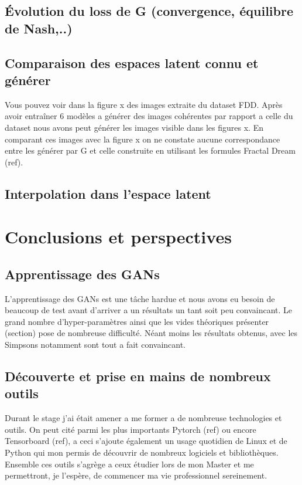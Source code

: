 \documentclass[11pt,francais]{article}
\begin{document}
\subsection{Évolution du loss de G (convergence, équilibre de Nash,..)}
\subsection{Comparaison des espaces latent connu et générer}
Vous pouvez voir dans la figure x des images extraite du dataset FDD.
Après avoir entraîner 6 modèles a générer des images cohérentes par rapport a celle du dataset nous avons peut générer les images visible dans les figures x. 
En comparant ces images avec la figure x on ne constate aucune correspondance entre les générer par G et celle construite en utilisant les formules Fractal Dream (ref).


\subsection{Interpolation dans l'espace latent}

\section{Conclusions et perspectives}

\subsection{Apprentissage des GANs}
L'apprentissage des GANs est une tâche hardue et nous avons eu besoin de beaucoup de test avant d'arriver a un résultats un tant soit peu convaincant. Le grand nombre d'hyper-paramètres ainsi que les vides théoriques présenter (section) pose de nombreuse difficulté. Néant moins les résultats obtenus, avec les Simpsons notamment sont tout a fait convaincant.

\subsection{Découverte et prise en mains de nombreux outils}
Durant le stage j'ai était amener a me former a de nombreuse technologies et outils.
On peut cité parmi les plus importants Pytorch (ref) ou encore Tensorboard (ref), a ceci s'ajoute également un usage quotidien de Linux et de Python qui mon permis de découvrir de nombreux logiciels et bibliothèques.
Ensemble ces outils s'agrège a ceux étudier lors de mon Master et me permettront, je l'espère, de commencer ma vie professionnel sereinement.
\end{document}
